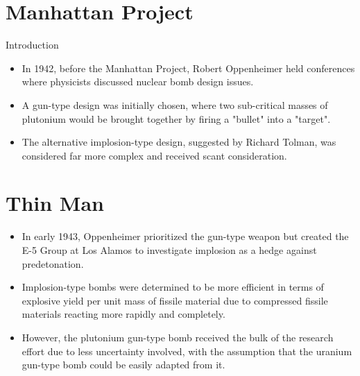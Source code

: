 \documentclass{loyola-beamer}
\begin{document}
\section{Manhattan Project}

\begin{frame}{Introduction}
	\begin{itemize}
		\item In 1942, before the Manhattan Project, Robert Oppenheimer held conferences where physicists discussed nuclear bomb design issues.
		\item A gun-type design was initially chosen, where two sub-critical masses of plutonium would be brought together by firing a "bullet" into a "target".
		\item The alternative implosion-type design, suggested by Richard Tolman, was considered far more complex and received scant consideration.
	\end{itemize}
\end{frame}

\section{Thin Man}

\begin{frame}
	\begin{itemize}
		\item In early 1943, Oppenheimer prioritized the gun-type weapon but created the E-5 Group at Los Alamos to investigate implosion as a hedge against predetonation.
		\item Implosion-type bombs were determined to be more efficient in terms of explosive yield per unit mass of fissile material due to compressed fissile materials reacting more rapidly and completely.
		\item However, the plutonium gun-type bomb received the bulk of the research effort due to less uncertainty involved, with the assumption that the uranium gun-type bomb could be easily adapted from it.
	\end{itemize}
\end{frame}
\end{document}
